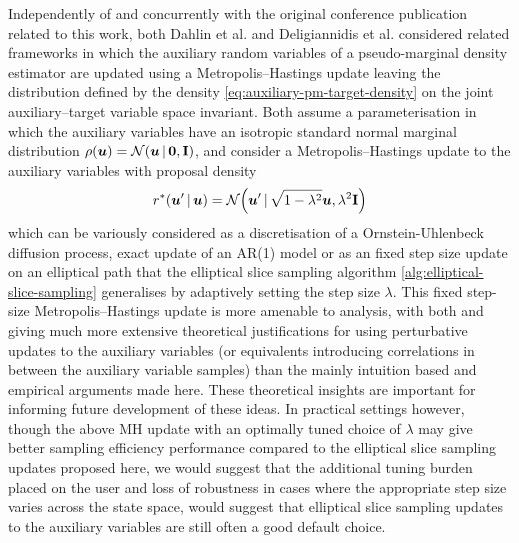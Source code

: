 Independently of and concurrently with the original conference publication \citep{murray2016pseudo} related to this work, both Dahlin et al. \citep{dahlin2015accelerating} and Deligiannidis et al. \citep{deligiannidis2015correlated} considered related frameworks in which the auxiliary random variables of a pseudo-marginal density estimator are updated using a Metropolis--Hastings update leaving the distribution defined by the density \eqref{eq:auxiliary-pm-target-density} on the joint auxiliary--target variable space invariant. Both assume a parameterisation in which the auxiliary variables have an isotropic standard normal marginal distribution $\rho(\vct{u}) = \nrm{\vct{u} \gvn \vct{0},\mathbf{I}}$, and consider a Metropolis--Hastings update to the auxiliary variables with proposal density
\begin{equation}\label{eq:crank-nicholson-proposal}
  r^*(\vct{u}'\gvn\vct{u}) = 
  \nrm{\vct{u}' \gvn \sqrt{1 - \lambda^2} \vct{u}, \lambda^2 \mathbf{I}}
\end{equation}
which can be variously considered as a discretisation of a Ornstein-Uhlenbeck diffusion process, exact update of an AR(1) model or as an fixed step size update on an elliptical path that the elliptical slice sampling algorithm \ref{alg:elliptical-slice-sampling} generalises by adaptively setting the step size $\lambda$. This fixed step-size Metropolis--Hastings update is more amenable to analysis, with both \citep{dahlin2015accelerating} and \citep{deligiannidis2015correlated} giving much more extensive theoretical justifications for using perturbative updates to the auxiliary variables (or equivalents introducing correlations in between the auxiliary variable samples) than the mainly intuition based and empirical arguments made here. These theoretical insights are important for informing future development of these ideas. In practical settings however, though the above \ac{MH} update with an optimally tuned choice of $\lambda$ may give better sampling efficiency performance compared to the elliptical slice sampling updates proposed here, we would suggest that the additional tuning burden placed on the user and loss of robustness in cases where the appropriate step size varies across the state space, would suggest that elliptical slice sampling updates to the auxiliary variables are still often a good default choice.

